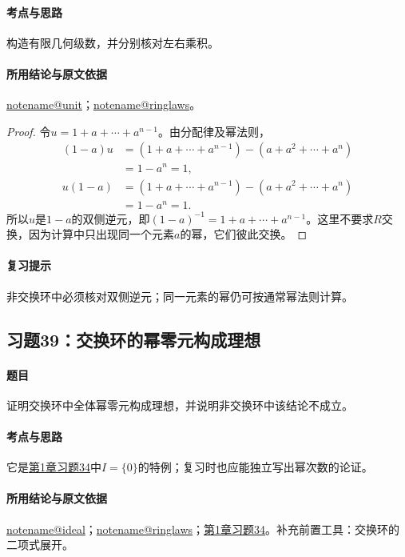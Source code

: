 \documentclass[UTF8,a4paper,11pt,fontset=windows]{ctexart}
\makeatletter
\newcommand{\noteref}[1]{\hyperref[note:#1]{\csname notename@#1\endcsname}}
\newcommand{\exref}[2]{\hyperref[ex:#1:#2]{第#1章习题#2}}
\makeatother
\begin{document}
\paragraph{考点与思路}
构造有限几何级数，并分别核对左右乘积。

\paragraph{所用结论与原文依据}
\noteref{unit}；\noteref{ringlaws}。


\begin{proof}
令$u=1+a+\cdots+a^{n-1}$。由分配律及幂法则，
\begin{align*}
(1-a)u&=(1+a+\cdots+a^{n-1})-(a+a^2+\cdots+a^n)\\
&=1-a^n=1,\\
u(1-a)&=(1+a+\cdots+a^{n-1})-(a+a^2+\cdots+a^n)\\
&=1-a^n=1.
\end{align*}
所以$u$是$1-a$的双侧逆元，即$(1-a)^{-1}=1+a+\cdots+a^{n-1}$。这里不要求$R$交换，因为计算中只出现同一个元素$a$的幂，它们彼此交换。
\end{proof}

\paragraph{复习提示}
非交换环中必须核对双侧逆元；同一元素的幂仍可按通常幂法则计算。


\subsection{习题39：\texorpdfstring{交换环的幂零元构成理想}{交换环的幂零元构成理想}}
\label{ex:1:39}

\paragraph{题目}
证明交换环中全体幂零元构成理想，并说明非交换环中该结论不成立。

\paragraph{考点与思路}
它是\exref{1}{34}中$I=\{0\}$的特例；复习时也应能独立写出幂次数的论证。

\paragraph{所用结论与原文依据}
\noteref{ideal}；\noteref{ringlaws}；\exref{1}{34}。补充前置工具：交换环的二项式展开。
\end{document}

